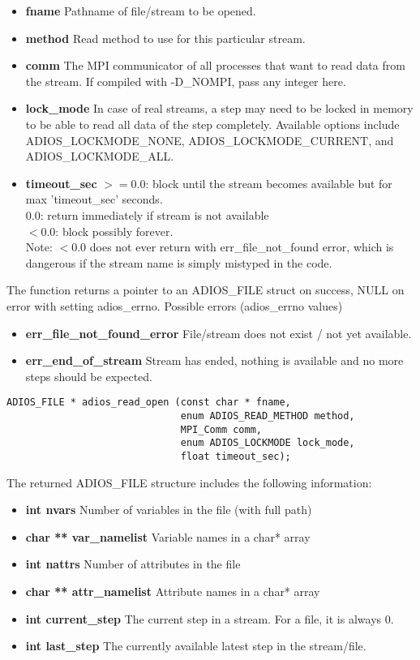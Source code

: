 \begin{itemize}
\item{\bf fname}  Pathname of file/stream to be opened.
\item{\bf method}  Read method to use for this particular stream.
\item{\bf comm}    The MPI communicator of all processes that want to read data from the stream.
If compiled with -D\_NOMPI, pass any integer here.
\item{\bf lock\_mode} In case of real streams, a step may need to be locked in memory to be able
to read all data of the step completely. Available options include ADIOS\_LOCKMODE\_NONE, ADIOS\_LOCKMODE\_CURRENT, and ADIOS\_LOCKMODE\_ALL.
\item{\bf timeout\_sec}  $>=0.0$: block until the stream becomes available but 
for max 'timeout\_sec' seconds.\\
$0.0$: return immediately if stream is not available\\
$<0.0$: block possibly forever.\\
Note: $<0.0$ does not ever return with err\_file\_not\_found error, 
which is dangerous if the stream name is simply mistyped in the code.
\end{itemize}

\noindent The function returns a pointer to an ADIOS\_FILE struct on success, NULL on error with setting adios\_errno. 
Possible errors (adios\_errno values)

\begin{itemize}
\item{\bf err\_file\_not\_found\_error}  File/stream does not exist / not yet available.
\item{\bf err\_end\_of\_stream}  Stream has ended, nothing is available and no more steps should be expected.
\end{itemize}


\begin{lstlisting}[alsolanguage=C]
ADIOS_FILE * adios_read_open (const char * fname, 
                              enum ADIOS_READ_METHOD method, 
                              MPI_Comm comm, 
                              enum ADIOS_LOCKMODE lock_mode,
                              float timeout_sec);
\end{lstlisting}

\noindent The returned ADIOS\_FILE structure includes the following information:

\begin{itemize}
\item{\bf int nvars}   Number of variables in the file (with full path)
\item{\bf char ** var\_namelist}   Variable names in a char* array
\item{\bf int nattrs}  Number of attributes in the file
\item{\bf char ** attr\_namelist}  Attribute names in a char* array
\item{\bf int current\_step}  The current step in a stream. For a file, it is always 0. 
\item{\bf int last\_step}     The currently available latest step in the stream/file.  
\end{itemize}


